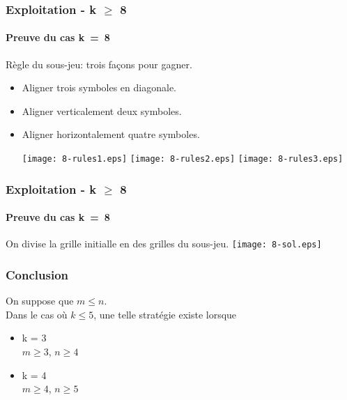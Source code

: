\documentclass{beamer}
\begin{document}
\begin{frame}
    \frametitle{Exploitation - k $\ge$ 8}
    \framesubtitle{Preuve du cas k~=~8}
    Règle du sous-jeu: trois façons pour gagner.
\begin{itemize}
    \item Aligner trois symboles en diagonale.
    \item Aligner verticalement deux symboles.
    \item Aligner horizontalement quatre symboles.
        \begin{center}
            \texttt{[image: 8-rules1.eps]}
            \texttt{[image: 8-rules2.eps]}
            \texttt{[image: 8-rules3.eps]}
        \end{center}
\end{itemize}
\end{frame}

\begin{frame}
    \frametitle{Exploitation - k $\ge$ 8}
    \framesubtitle{Preuve du cas k~=~8}
    On divise la grille initialle en des grilles du sous-jeu. 
    \texttt{[image: 8-sol.eps]}
    
\end{frame}

\begin{frame}
    \frametitle{Conclusion}
On suppose que $m \le n$.\\
Dans le cas où $k \le 5$, une telle stratégie existe lorsque
\begin{itemize}[<+->]
    \item k = 3\\
        $m \ge 3$, $n \ge 4$
    \item k = 4\\
        $m \ge 4$, $n \ge 5$
\end{itemize}
\end{frame}
\end{document}
